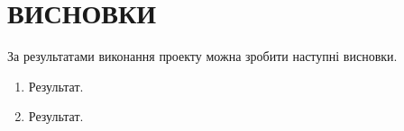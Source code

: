 \chapter{ВИСНОВКИ}

За результатами виконання проекту можна зробити наступні висновки.

\begin{enumerate}
\item Результат.
\item Результат.
\end{enumerate}

